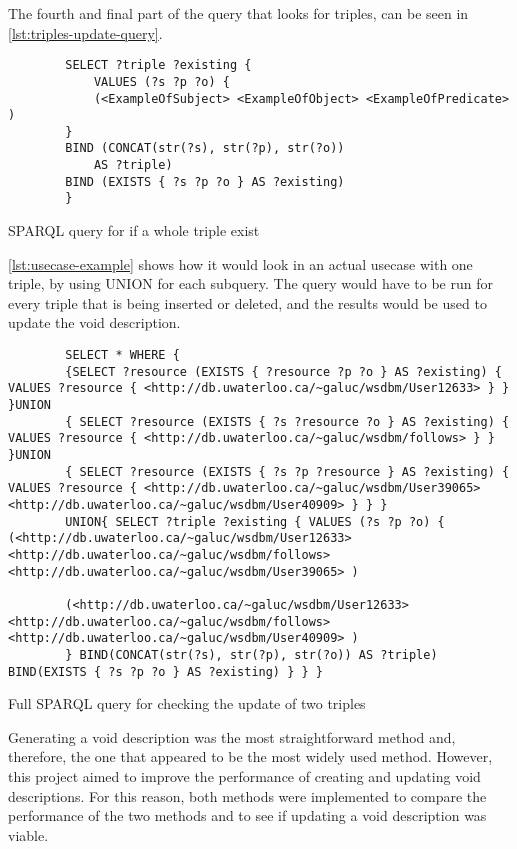 The fourth and final part of the query that looks for triples, can be seen in \autoref{lst:triples-update-query}.

\begin{listing}[htb!]
    \begin{verbatim}          
        SELECT ?triple ?existing { 
            VALUES (?s ?p ?o) {  
            (<ExampleOfSubject> <ExampleOfObject> <ExampleOfPredicate> ) 
        }
        BIND (CONCAT(str(?s), str(?p), str(?o)) 
            AS ?triple)
        BIND (EXISTS { ?s ?p ?o } AS ?existing)
        }
    \end{verbatim}
    \caption{SPARQL query for if a whole triple exist}
    \label{lst:triples-update-query}
\end{listing}

\autoref{lst:usecase-example} shows how it would look in an actual usecase with one triple, by using UNION for each subquery. The query would have to be run for every triple that is being inserted or deleted, and the results would be used to update the \gls{void} description.

\begin{listing}[htb!]
    \begin{verbatim}          
        SELECT * WHERE { 
        {SELECT ?resource (EXISTS { ?resource ?p ?o } AS ?existing) { VALUES ?resource { <http://db.uwaterloo.ca/~galuc/wsdbm/User12633> } } }UNION 
        { SELECT ?resource (EXISTS { ?s ?resource ?o } AS ?existing) { VALUES ?resource { <http://db.uwaterloo.ca/~galuc/wsdbm/follows> } } }UNION 
        { SELECT ?resource (EXISTS { ?s ?p ?resource } AS ?existing) { VALUES ?resource { <http://db.uwaterloo.ca/~galuc/wsdbm/User39065> <http://db.uwaterloo.ca/~galuc/wsdbm/User40909> } } }
        UNION{ SELECT ?triple ?existing { VALUES (?s ?p ?o) {  (<http://db.uwaterloo.ca/~galuc/wsdbm/User12633>   <http://db.uwaterloo.ca/~galuc/wsdbm/follows>   <http://db.uwaterloo.ca/~galuc/wsdbm/User39065> )

        (<http://db.uwaterloo.ca/~galuc/wsdbm/User12633>       <http://db.uwaterloo.ca/~galuc/wsdbm/follows>   <http://db.uwaterloo.ca/~galuc/wsdbm/User40909> ) 
        } BIND(CONCAT(str(?s), str(?p), str(?o)) AS ?triple) BIND(EXISTS { ?s ?p ?o } AS ?existing) } } } 
    \end{verbatim}
    \caption{Full SPARQL query for checking the update of two triples}
    \label{lst:usecase-example}
\end{listing}


Generating a \gls{void} description was the most straightforward method and, therefore, the one that appeared to be the most widely used method. However, this project aimed to improve the performance of creating and updating \gls{void} descriptions. For this reason, both methods were implemented to compare the performance of the two methods and to see if updating a \gls{void} description was viable.
